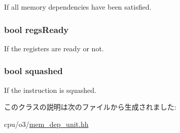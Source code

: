 \label{classMemDepUnit_1_1MemDepEntry_a1f5ab91d27c3ebd7a0bdc85c87030126}
If all memory dependencies have been satisfied. \hypertarget{classMemDepUnit_1_1MemDepEntry_afc55485f8d2b3483d6b56df95ffc0156}{
\subsubsection[{regsReady}]{\setlength{\rightskip}{0pt plus 5cm}bool {\bf regsReady}}}
\label{classMemDepUnit_1_1MemDepEntry_afc55485f8d2b3483d6b56df95ffc0156}
If the registers are ready or not. \hypertarget{classMemDepUnit_1_1MemDepEntry_ab80f932400baee226095b8eb35f92383}{
\subsubsection[{squashed}]{\setlength{\rightskip}{0pt plus 5cm}bool {\bf squashed}}}
\label{classMemDepUnit_1_1MemDepEntry_ab80f932400baee226095b8eb35f92383}
If the instruction is squashed. 

このクラスの説明は次のファイルから生成されました:\begin{DoxyCompactItemize}
\item 
cpu/o3/\hyperlink{o3_2mem__dep__unit_8hh}{mem\_\-dep\_\-unit.hh}\end{DoxyCompactItemize}
